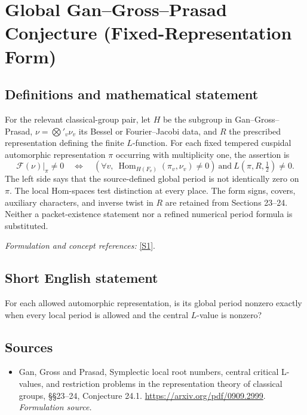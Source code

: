 \documentclass[11pt]{article}
\begin{document}
\section*{\texorpdfstring{Global Gan–Gross–Prasad Conjecture (Fixed-Representation Form)}{Global Gan–Gross–Prasad Conjecture (Fixed-Representation Form)}}\label{30006977}
\subsection{Definitions and mathematical statement}
For the relevant classical-group pair, let $H$ be the subgroup in Gan--Gross--Prasad, $\nu=\bigotimes'_v\nu_v$ its Bessel or Fourier--Jacobi data, and $R$ the prescribed representation defining the finite $L$-function. For each fixed tempered cuspidal automorphic representation $\pi$ occurring with multiplicity one, the assertion is
\[
 \mathcal F(\nu)|_\pi\ne0
 \quad\Longleftrightarrow\quad
 \left(\forall v,\ \operatorname{Hom}_{H(F_v)}(\pi_v,\nu_v)\ne0\right)
 \ \text{and}\ L(\pi,R,\tfrac12)\ne0.
\]
The left side says that the source-defined global period is not identically zero on $\pi$. The local Hom-spaces test distinction at every place. The form signs, covers, auxiliary characters, and inverse twist in $R$ are retained from Sections 23--24. Neither a packet-existence statement nor a refined numerical period formula is substituted.
\par\smallskip\textit{Formulation and concept references:} \href{https://arxiv.org/pdf/0909.2999}{[S1]}.

\subsection{Short English statement}
For each allowed automorphic representation, is its global period nonzero exactly when every local period is allowed and the central $L$-value is nonzero?
\subsection{Sources}
\begin{itemize}
\item[S1]Gan, Gross and Prasad, Symplectic local root numbers, central critical L-values, and restriction problems in the representation theory of classical groups, §§23–24, Conjecture 24.1.
\url{https://arxiv.org/pdf/0909.2999}.
\textit{Formulation source.}
\end{itemize}
\end{document}
